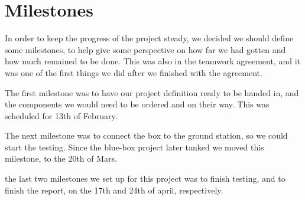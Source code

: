 \chapter{Milestones}
In order to keep the progress of the project steady, we decided we should define some milestones, to help give some perspective on how far we had gotten and how much remained to be done. This was also in the teamwork agreement, and it was one of the first things we did after we finished with the agreement.

The first milestone was to have our project definition ready to be handed in, and the components we would need to be ordered and on their way. This was scheduled for 13th of February. 

The next milestone was to connect the box to the ground station, so we could start the testing. Since the blue-box project later tanked we moved this milestone, to the 20th of Mars.

the last two milestones we set up for this project was to finish testing, and to finish the report, on the 17th and 24th of april, respectively.